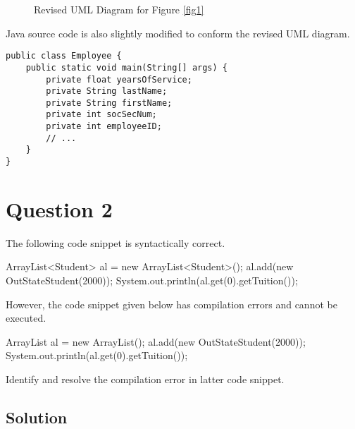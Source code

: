 \begin{figure}
\centering
\caption{Revised UML Diagram for Figure \ref{fig1}}\label{fig2}
\end{figure}

Java source code is also slightly modified to conform the revised UML diagram.

\begin{lstlisting}
public class Employee {
	public static void main(String[] args) {
		private float yearsOfService;
		private String lastName;
		private String firstName;
		private int socSecNum;
		private int employeeID;
		// ...
	}
}
\end{lstlisting}

\section{Question 2}

The following code snippet is syntactically correct.

\begin{darkListing}
ArrayList<Student> al = new ArrayList<Student>();
al.add(new OutStateStudent(2000));
System.out.println(al.get(0).getTuition());
\end{darkListing}

However, the code snippet given below has compilation errors and cannot be executed.

\begin{darkListing}
ArrayList al = new ArrayList();
al.add(new OutStateStudent(2000));
System.out.println(al.get(0).getTuition());
\end{darkListing}

Identify and resolve the compilation error in latter code snippet.

\subsection*{Solution}

